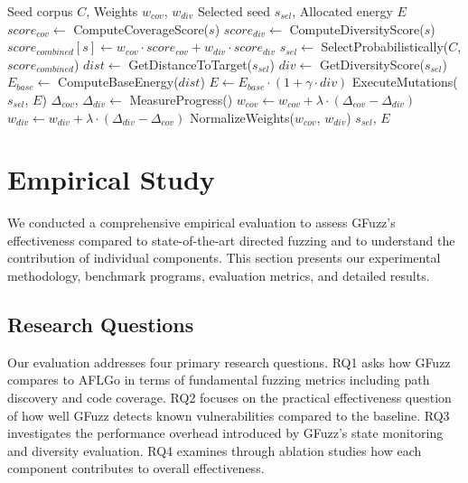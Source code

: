 \documentclass[review]{elsarticle}
\begin{document}
\begin{algorithm}[t]
\caption{Adaptive Seed Scheduling}
\label{alg:scheduling}
\begin{algorithmic}[1]
\REQUIRE Seed corpus $C$, Weights $w_{cov}$, $w_{div}$
\ENSURE Selected seed $s_{sel}$, Allocated energy $E$
    \STATE $score_{cov} \leftarrow$ ComputeCoverageScore($s$)
    \STATE $score_{div} \leftarrow$ ComputeDiversityScore($s$)
    \STATE $score_{combined}[s] \leftarrow w_{cov} \cdot score_{cov} + w_{div} \cdot score_{div}$
\ENDFOR
\STATE $s_{sel} \leftarrow$ SelectProbabilistically($C$, $score_{combined}$)
\STATE $dist \leftarrow$ GetDistanceToTarget($s_{sel}$)
\STATE $div \leftarrow$ GetDiversityScore($s_{sel}$)
\STATE $E_{base} \leftarrow$ ComputeBaseEnergy($dist$)
\STATE $E \leftarrow E_{base} \cdot (1 + \gamma \cdot div)$
\STATE ExecuteMutations($s_{sel}$, $E$)
\STATE $\Delta_{cov}$, $\Delta_{div} \leftarrow$ MeasureProgress()
\STATE $w_{cov} \leftarrow w_{cov} + \lambda \cdot (\Delta_{cov} - \Delta_{div})$
\STATE $w_{div} \leftarrow w_{div} + \lambda \cdot (\Delta_{div} - \Delta_{cov})$
\STATE NormalizeWeights($w_{cov}$, $w_{div}$)
\RETURN $s_{sel}$, $E$
\end{algorithmic}
\end{algorithm}

\section{Empirical Study}
\label{sec:empirical}

We conducted a comprehensive empirical evaluation to assess GFuzz's effectiveness compared to state-of-the-art directed fuzzing and to understand the contribution of individual components. This section presents our experimental methodology, benchmark programs, evaluation metrics, and detailed results.

\subsection{Research Questions}

Our evaluation addresses four primary research questions. RQ1 asks how GFuzz compares to AFLGo in terms of fundamental fuzzing metrics including path discovery and code coverage. RQ2 focuses on the practical effectiveness question of how well GFuzz detects known vulnerabilities compared to the baseline. RQ3 investigates the performance overhead introduced by GFuzz's state monitoring and diversity evaluation. RQ4 examines through ablation studies how each component contributes to overall effectiveness.
\end{document}

